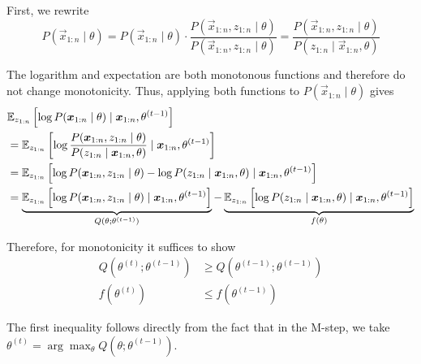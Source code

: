 First, we rewrite
\begin{equation*}
P(\vec{x}_{1:n} \mid \theta)
= P(\vec{x}_{1:n} \mid \theta) \cdot \frac{P(\vec{x}_{1:n}, z_{1:n} \mid \theta)}{P(\vec{x}_{1:n}, z_{1:n} \mid \theta)}
= \frac{P(\vec{x}_{1:n}, z_{1:n} \mid \theta)}{P(z_{1:n} \mid \vec{x}_{1:n}, \theta)}
\end{equation*}

The logarithm and expectation are both
monotonous functions and therefore
do not change monotonicity.
Thus, applying both functions to
$P(\vec{x}_{1:n} \mid \theta)$ gives
\begin{align*}
& \mathbb{E}_{z_{1:n}}\left[
\log{P(\boldsymbol{x}_{1:n} \mid \theta)}
\mid \boldsymbol{x}_{1:n}, \theta^{(t-1)}
\right] \\
&= \mathbb{E}_{z_{1:n}}\left[
\log{\frac{P(\boldsymbol{x}_{1:n}, z_{1:n} \mid \theta)}{P(z_{1:n} \mid \boldsymbol{x}_{1:n}, \theta)}}
\mid \boldsymbol{x}_{1:n}, \theta^{(t-1)}
\right] \\
&= \mathbb{E}_{z_{1:n}}\left[
\log{P(\boldsymbol{x}_{1:n}, z_{1:n} \mid \theta)} - \log{P(z_{1:n} \mid \boldsymbol{x}_{1:n}, \theta)}
\mid \boldsymbol{x}_{1:n}, \theta^{(t-1)}
\right] \\
&= \underbrace{
	\mathbb{E}_{z_{1:n}}\left[
	\log{P(\boldsymbol{x}_{1:n}, z_{1:n} \mid \theta)}
	\mid \boldsymbol{x}_{1:n}, \theta^{(t-1)}
	\right]
}_{Q(\theta; \theta^{(t-1)})}
-
\underbrace{
	\mathbb{E}_{z_{1:n}}\left[
	\log{P(z_{1:n} \mid \boldsymbol{x}_{1:n}, \theta)}
	\mid \boldsymbol{x}_{1:n}, \theta^{(t-1)}
	\right]
}_{f(\theta)}
\end{align*}

Therefore, for monotonicity
it suffices to show
\begin{align*}
Q(\theta^{(t)}; \theta^{(t-1)}) &\geq Q(\theta^{(t - 1)}; \theta^{(t-1)}) \\
f(\theta^{(t)}) &\leq f(\theta^{(t-1)})
\end{align*}

The first inequality follows directly from
the fact that in the M-step,
we take $\theta^{(t)} = \arg\max_\theta{Q(\theta; \theta^{(t-1)})}$.

